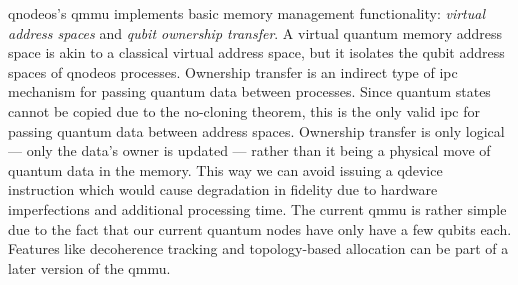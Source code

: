 \acrshort{qnodeos}'s \acrshort{qmmu} implements basic memory management functionality: \emph{virtual
address spaces} and \emph{qubit ownership transfer}. A virtual quantum memory address space is akin
to a classical virtual address space, but it isolates the qubit address spaces of \acrshort{qnodeos}
processes. Ownership transfer is an indirect type of \acrfull{ipc} mechanism for passing quantum
data between processes. Since quantum states cannot be copied due to the no-cloning theorem, this is
the only valid \acrshort{ipc} for passing quantum data between address spaces. Ownership transfer is
only logical --- only the data's owner is updated --- rather than it being a physical move of
quantum data in the memory. This way we can avoid issuing a \acrshort{qdevice} instruction which
would cause degradation in fidelity due to hardware imperfections and additional processing time.
The current \acrshort{qmmu} is rather simple due to the fact that our current quantum nodes have
only have a few qubits each. Features like decoherence tracking and topology-based allocation can be
part of a later version of the \acrshort{qmmu}.

\printbibliography[heading=subbibintoc,title={References},notcategory=noprint]
